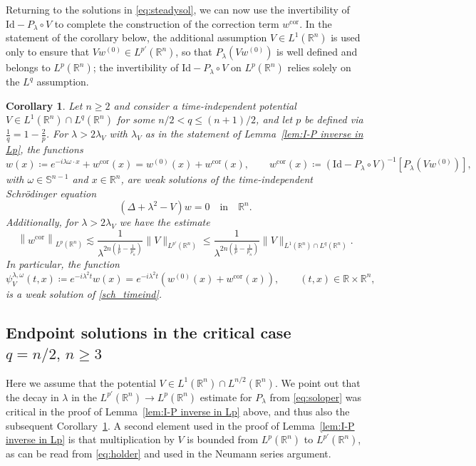 \documentclass[11pt,a4paper]{amsart}
\newtheorem{corollary}[proposition]{Corollary}
\theoremstyle{remark}
\theoremstyle{definition}
\newcommand{\R}{\mathbb{R}}
\begin{document}
Returning to the solutions in \eqref{eq:steadysol}, we can now use the invertibility of $\mathrm{Id}-P_\lambda\circ V$ to complete the construction of the correction term $w^{\mathrm{cor}}$. In the statement of the corollary below, the additional assumption $V\in L^1(\R^n)$ is used only to ensure that $Vw^{(0)}\in L^{p'}(\R^n)$, so that $P_\lambda(Vw^{(0)})$ is well defined and belongs to $L^p(\R^n)$; the invertibility of $\mathrm{Id}-P_\lambda\circ V$ on $L^p(\R^n)$ relies solely on the $L^q$ assumption.
\begin{corollary}\label{cor:solutions}\sl Let $n\geq 2$ and consider a time-independent potential $V\in L^1(\R^n)\cap L^q(\R^n)$ for some $n/2<q\leq (n+1)/2$, and let $p$ be defined via $\frac{1}{q} = 1 - \frac{2}{p} $. For $\lambda > 2\lambda_V$ with $\lambda_V$ as in the statement of Lemma~\ref{lem:I-P inverse in Lp}, the functions
\[
w(x)\coloneqq e^{-i\lambda\omega\cdot x}+w^{\mathrm{cor}}(x)= w^{(0)}(x)+w^{\mathrm{cor}}(x),\qquad w^{\mathrm{cor}}(x)\coloneqq (\mathrm{Id}-P_\lambda\circ V)^{-1}[P_\lambda(Vw^{(0)})],
\]
with $ \omega\in\mathbb S^{n-1}$ and  $x\in\R^n$,
are weak solutions of the time-independent Schr\"odinger equation 
\[
(\Delta+\lambda^2-V)w=0\quad\mathrm{in}\quad\R^n.
\]
Additionally, for $\lambda>2\lambda_V$ we have the estimate
\[
\left \|w^{\mathrm{cor}}\right\|_{L^p(\R^n)}\lesssim \frac{1}{\lambda^{2n\left(\frac1p-\frac{1}{p_n}\right)}} \|V\|_{L^{p'}(\R^n)}\leq \frac{1}{\lambda^{2n\left(\frac1p-\frac{1}{p_n}\right)}} \|V\|_{L^1(\R^n)\cap L^q(\R^n)}.
\]
In particular, the function 
\[
\psi_V ^{\lambda,\omega}(t,x)\coloneqq e^{-i\lambda^2 t}w(x)= e^{-i\lambda^2 t}(w^{(0)}(x)+w^{\mathrm{cor}}(x)),\qquad (t,x)\in\R\times \R^n,
\]
is a weak solution of \eqref{sch_timeind}.
\end{corollary}


\subsection{Endpoint solutions in the critical case \texorpdfstring{$q=n/2,\, n\geq 3$}{q=n/2, n>=3}}\label{sec:stend} Here we assume that the potential $V\in L^1(\R^n)\cap L^{n/2}(\R^n)$. We point out that the decay in $\lambda$ in the $L^{p'}(\R^n)\to L^p(\R^n)$ estimate for $P_\lambda$ from \eqref{eq:soloper} was critical in the proof of Lemma~\ref{lem:I-P inverse in Lp} above, and thus also the subsequent Corollary~\ref{cor:solutions}. A second element used in the proof of Lemma~\ref{lem:I-P inverse in Lp} is that multiplication by $V$ is bounded from $L^p(\R^n)$ to $L^{p'}(\R^n)$, as can be read from \eqref{eq:holder} and used in the Neumann series argument.
\end{document}
